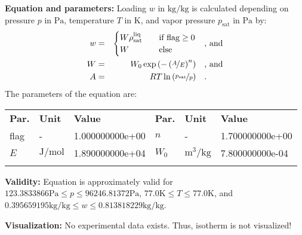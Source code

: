 \textbf{Equation and parameters:}
\newline
%
Loading $w$ in $\si{\kilogram\per\kilogram}$ is calculated depending on pressure $p$ in $\si{\pascal}$, temperature $T$ in $\si{\kelvin}$, and vapor pressure $p_\mathrm{sat}$ in $\si{\pascal}$ by:
%
\begin{equation*}
\begin{split}
w &=& \begin{cases} W \rho_\mathrm{sat}^{\mathrm{liq}} & \quad \text{if flag} \geq 0 \\ W & \quad \text{else} \end{cases} & \quad\text{, and} \\
W &=& W_0 \exp \left( - \left( \nicefrac{A}{E} \right) ^{n} \right) & \quad\text{, and} \\
A &=& R T \ln \left( \nicefrac{p_\mathrm{sat}}{p} \right) & \quad\text{.} \\
\end{split}
\end{equation*}
%
The parameters of the equation are:
%
\begin{longtable}[l]{lll|lll}
\toprule
\addlinespace
\textbf{Par.} & \textbf{Unit} & \textbf{Value} &	\textbf{Par.} & \textbf{Unit} & \textbf{Value} \\
\addlinespace
\midrule
\endhead

\bottomrule
\endfoot
\bottomrule
\endlastfoot
\addlinespace

flag & - & 1.000000000e+00 & $n$ & - & 1.700000000e+00 \\
$E$ & $\si{\joule\per\mole}$ & 1.890000000e+04 & $W_0$ & $\si{\cubic\meter\per\kilogram}$ & 7.800000000e-04 \\

\addlinespace\end{longtable}

\textbf{Validity:}
\newline
Equation is approximately valid for $123.3833866 \si{\pascal} \leq p \leq 96246.81372 \si{\pascal}$,  $77.0 \si{\kelvin} \leq T \leq 77.0 \si{\kelvin}$, and $0.395659195 \si{\kilogram\per\kilogram} \leq w \leq 0.813818229 \si{\kilogram\per\kilogram}$.
\newline

\textbf{Visualization:}
%
\newline
No experimental data exists. Thus, isotherm is not visualized!
%

\FloatBarrier
\newpage
